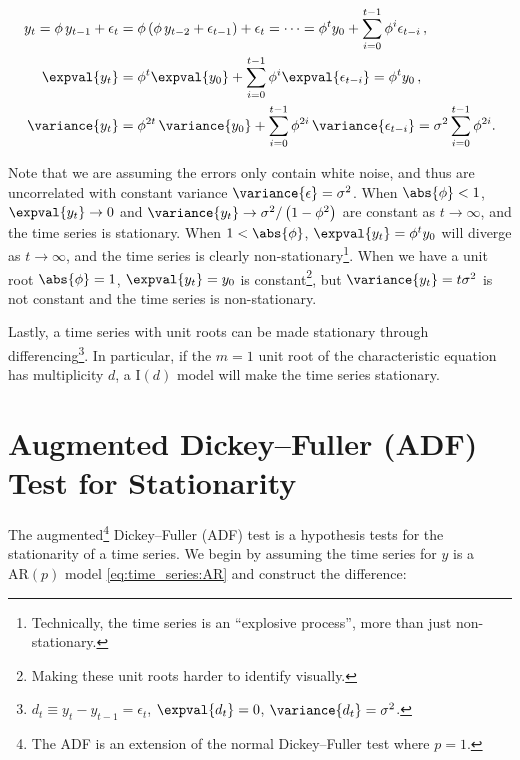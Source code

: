 \begin{subequations}\label{eq:time_series:unit_root_ex}
\begin{align}
y_{t}
= \phi\, y_{t-1} + \epsilon_{t}
&= \phi \left(\phi\, y_{t-2} + \epsilon_{t-1}\right) + \epsilon_{t}
= \cdots
= \phi^{t} y_{0} + \sum_{i=0}^{t-1} \phi^{i} \epsilon_{t-i}\,, \label{eq:time_series:unit_root_ex:expand} \\
\expval{y_{t}}
&= \phi^{t} \expval{y_{0}} + \sum_{i=0}^{t-1} \phi^{i} \expval{\epsilon_{t-i}}
= \phi^{t} y_{0}\,, \label{eq:time_series:unit_root_ex:expval} \\
\variance{y_{t}}
&= \phi^{2t}\, \variance{y_{0}} + \sum_{i=0}^{t-1} \phi^{2i}\, \variance{\epsilon_{t-i}}
= \sigma^{2} \sum_{i=0}^{t-1} \phi^{2i}. \label{eq:time_series:unit_root_ex:var}
\end{align}
\end{subequations}

\noindent Note that we are assuming the errors only contain white noise,
and thus are uncorrelated with constant variance $\variance{\epsilon} = \sigma^{2}$.
When $\abs{\phi} < 1$, $\expval{y_{t}} \to 0$ and
$\variance{y_{t}} \to \sigma^{2}/\left(1-\phi^{2}\right)$ are constant
as $t \to \infty$, and the time series is stationary.
When $1 < \abs{\phi}$, $\expval{y_{t}} = \phi^{t} y_{0}$
will diverge as $t \to \infty$, and the time series is clearly non-stationary\footnote{Technically,
the time series is an ``explosive process'', more than just non-stationary.}.
When we have a unit root $\abs{\phi} = 1$,
$\expval{y_{t}} = y_{0}$ is constant\footnote{Making these unit roots harder to identify visually.},
but $\variance{y_{t}} = t \sigma^{2}$ is not constant and the time series is non-stationary.

Lastly, a time series with unit roots can be made stationary through
differencing\footnote{$d_{t} \equiv y_{t} - y_{t-1} = \epsilon_{t}$, $\expval{d_{t}} = 0$, $\variance{d_{t}} = \sigma^{2}$.}.
In particular, if the $m=1$ unit root of the characteristic equation has multiplicity $d$,
a $\text{I}\left(d\right)$ model will make the time series stationary.

\section{Augmented Dickey--Fuller (ADF) Test for Stationarity}
\label{time_series:ADF}

The augmented\footnote{The ADF is an extension of the normal Dickey--Fuller test where $p = 1$.} Dickey--Fuller (ADF) test
is a hypothesis tests for the stationarity of a time series.
We begin by assuming the time series for $y$ is a $\text{AR}\left(p\right)$ model \cref{eq:time_series:AR}
and construct the difference:

